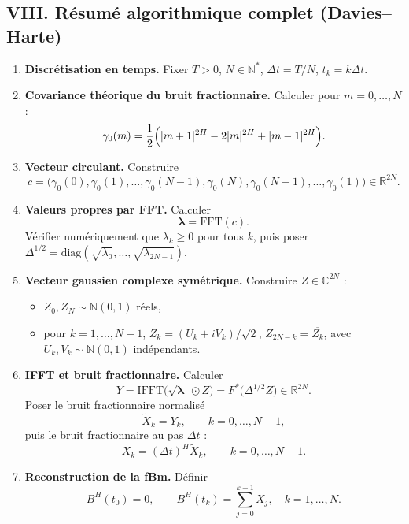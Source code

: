 \documentclass[11pt,a4paper]{article}
\newcommand{\R}{\mathbb{R}}
\newcommand{\C}{\mathbb{C}}
\newcommand{\N}{\mathbb{N}}
\newcommand{\1}{\mathbf{1}}
\newcommand{\bH}{B^{H}}
\begin{document}
\subsection*{VIII. Résumé algorithmique complet (Davies--Harte)}

\begin{enumerate}
  \item \textbf{Discrétisation en temps.}
        Fixer $T>0$, $N\in\mathbb{N}^\ast$,
        $\Delta t = T/N$, $t_k = k\Delta t$.
  \item \textbf{Covariance théorique du bruit fractionnaire.}
        Calculer pour $m=0,\dots,N$ :
        \[
          \gamma_0(m)
          = \frac{1}{2}
            \Bigl(|m+1|^{2H} - 2|m|^{2H} + |m-1|^{2H}\Bigr).
        \]
  \item \textbf{Vecteur circulant.}
        Construire
        \[
          c = \bigl(\gamma_0(0),\gamma_0(1),\dots,
                    \gamma_0(N-1),\gamma_0(N),
                    \gamma_0(N-1),\dots,\gamma_0(1)\bigr)
          \in\R^{2N}.
        \]
  \item \textbf{Valeurs propres par FFT.}
        Calculer
        \[
          \bm{\lambda} = \mathrm{FFT}(c).
        \]
        Vérifier numériquement que $\lambda_k\ge 0$ pour tous $k$,
        puis poser $\Delta^{1/2}=\mathrm{diag}(\sqrt{\lambda_0},
        \dots,\sqrt{\lambda_{2N-1}})$.
  \item \textbf{Vecteur gaussien complexe symétrique.}
        Construire $Z\in\C^{2N}$ :
        \begin{itemize}
          \item $Z_0,Z_N\sim\N(0,1)$ réels,
          \item pour $k=1,\dots,N-1$,
                $Z_k = (U_k+iV_k)/\sqrt{2}$,
                $Z_{2N-k} = \overline{Z_k}$,
                avec $U_k,V_k\sim\N(0,1)$ indépendants.
        \end{itemize}
  \item \textbf{IFFT et bruit fractionnaire.}
        Calculer
        \[
          Y = \mathrm{IFFT}\bigl(\sqrt{\bm{\lambda}}\;\odot Z\bigr)
          = F^{\ast}\bigl(\Delta^{1/2}Z\bigr)
          \in\R^{2N}.
        \]
        Poser le bruit fractionnaire normalisé
        \[
          \tilde{X}_k = Y_k,\qquad k=0,\dots,N-1,
        \]
        puis le bruit fractionnaire au pas $\Delta t$ :
        \[
          X_k = (\Delta t)^H \tilde{X}_k,\qquad k=0,\dots,N-1.
        \]
  \item \textbf{Reconstruction de la fBm.}
        Définir
        \[
          \bH(t_0) = 0,
          \qquad
          \bH(t_k) = \sum_{j=0}^{k-1} X_j,
          \quad k=1,\dots,N.
        \]
\end{enumerate}
\end{document}
